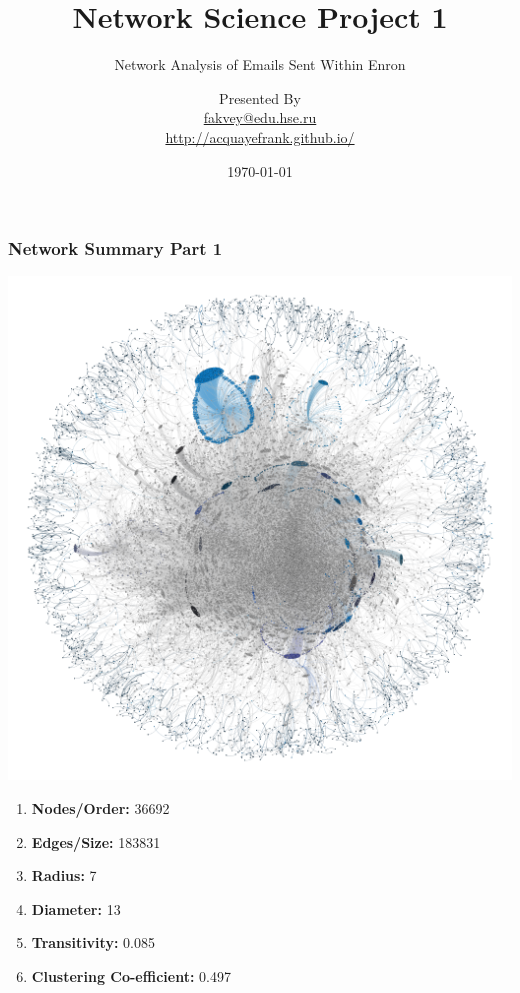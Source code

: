 \documentclass{beamer}
\title[Short title]{Network Science Project 1}
\subtitle{ Network Analysis of Emails Sent Within Enron}
\author[Frank Acquaye]{Presented By \\ \smallskip \scriptsize \url{fakvey@edu.hse.ru}\\\url{http://acquayefrank.github.io/}}
\institute[Higher School of Economics]{National Research University \\ Higher School of Economics (Moscow)}
\date{\today}
\begin{document}

\frame[plain]{\titlepage}	%


\begin{frame}
\frametitle{Network Summary Part 1}
	\begin{multicols}{2}
		\includegraphics[width=\columnwidth]{na-ee-graph-final.png}
		\columnbreak

		\begin{enumerate} 
			\item \textbf{Nodes/Order:} 36692
			\item \textbf{Edges/Size:} 183831
			\item \textbf{Radius:} 7
			\item \textbf{Diameter:} 13		
			\item \textbf{Transitivity:}  0.085
			\item \textbf{Clustering Co-efficient:} 0.497
		\end{enumerate} 
	\end{multicols}
\end{frame}
\end{document}
